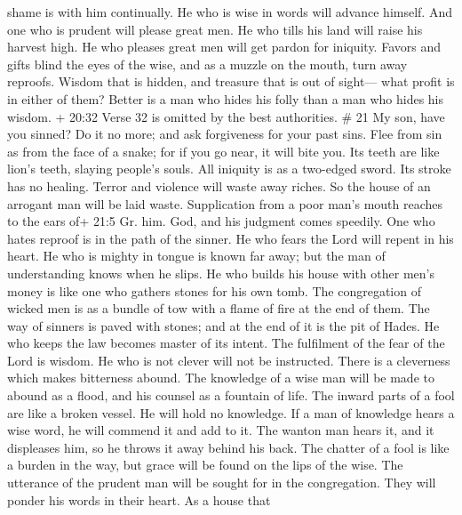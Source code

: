 shame is with him continually.  He who is wise in words
will advance himself. And one who is prudent will please great men.
 He who tills his land will raise his harvest high. He who
pleases great men will get pardon for iniquity.  Favors and
gifts blind the eyes of the wise, and as a muzzle on the mouth, turn
away reproofs.  Wisdom that is hidden, and treasure that is
out of sight--- what profit is in either of them?  Better
is a man who hides his folly than a man who hides his wisdom.
 + 20:32 Verse 32 is omitted by the best authorities. \# 21
 My son, have you sinned? Do it no more; and ask forgiveness
for your past sins.  Flee from sin as from the face of a
snake; for if you go near, it will bite you. Its teeth are like lion's
teeth, slaying people's souls.  All iniquity is as a
two-edged sword. Its stroke has no healing.  Terror and
violence will waste away riches. So the house of an arrogant man will be
laid waste.  Supplication from a poor man's mouth reaches to
the ears of+ 21:5 Gr. him. God, and his judgment comes speedily.
 One who hates reproof is in the path of the sinner. He who
fears the Lord will repent in his heart.  He who is mighty
in tongue is known far away; but the man of understanding knows when he
slips.  He who builds his house with other men's money is
like one who gathers stones for his own tomb.  The
congregation of wicked men is as a bundle of tow with a flame of fire at
the end of them.  The way of sinners is paved with stones;
and at the end of it is the pit of Hades.  He who keeps the
law becomes master of its intent. The fulfilment of the fear of the Lord
is wisdom.  He who is not clever will not be instructed.
There is a cleverness which makes bitterness abound.  The
knowledge of a wise man will be made to abound as a flood, and his
counsel as a fountain of life.  The inward parts of a fool
are like a broken vessel. He will hold no knowledge.  If a
man of knowledge hears a wise word, he will commend it and add to it.
The wanton man hears it, and it displeases him, so he throws it away
behind his back.  The chatter of a fool is like a burden in
the way, but grace will be found on the lips of the wise. 
The utterance of the prudent man will be sought for in the congregation.
They will ponder his words in their heart.  As a house that
